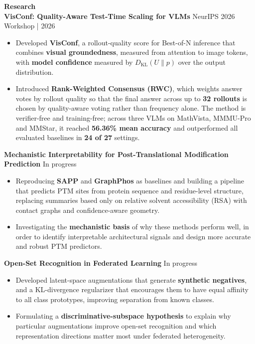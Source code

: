 \documentclass[11pt]{article}
\begin{document}
\vspace{0.3cm}
{\large \textbf{Research}}
\vspace{0.15cm}\\
\textbf{VisConf: Quality-Aware Test-Time Scaling for VLMs} \hfill NeurIPS 2026 Workshop | 2026
\begin{itemize}[noitemsep, topsep=0pt, partopsep=0pt, parsep=0pt]
    \item Developed \textbf{VisConf}, a rollout-quality score for Best-of-N inference that combines \textbf{visual groundedness}, measured from attention to image tokens, with \textbf{model confidence} measured by $D_{\mathrm{KL}}(U\|p)$ over the output distribution.
    \item Introduced \textbf{Rank-Weighted Consensus (RWC)}, which weights answer votes by rollout quality so that the final answer across up to \textbf{32 rollouts} is chosen by quality-aware voting rather than frequency alone. The method is verifier-free and training-free; across three VLMs on MathVista, MMMU-Pro and MMStar, it reached \textbf{56.36\% mean accuracy} and outperformed all evaluated baselines in \textbf{24 of 27} settings.
\end{itemize}
\textbf{Mechanistic Interpretability for Post-Translational Modification Prediction} \hfill In progress
\begin{itemize}[noitemsep, topsep=0pt, partopsep=0pt, parsep=0pt]
    \item Reproducing \textbf{SAPP} and \textbf{GraphPhos} as baselines and building a pipeline that predicts PTM sites from protein sequence and residue-level structure, replacing summaries based only on relative solvent accessibility (RSA) with contact graphs and confidence-aware geometry.
    \item Investigating the \textbf{mechanistic basis} of why these methods perform well, in order to identify interpretable architectural signals and design more accurate and robust PTM predictors.
\end{itemize}
\textbf{Open-Set Recognition in Federated Learning} \hfill In progress
\begin{itemize}[noitemsep, topsep=0pt, partopsep=0pt, parsep=0pt]
    \item Developed latent-space augmentations that generate \textbf{synthetic negatives}, and a KL-divergence regularizer that encourages them to have equal affinity to all class prototypes, improving separation from known classes.
    \item Formulating a \textbf{discriminative-subspace hypothesis} to explain why particular augmentations improve open-set recognition and which representation directions matter most under federated heterogeneity.
\end{itemize}
\end{document}
